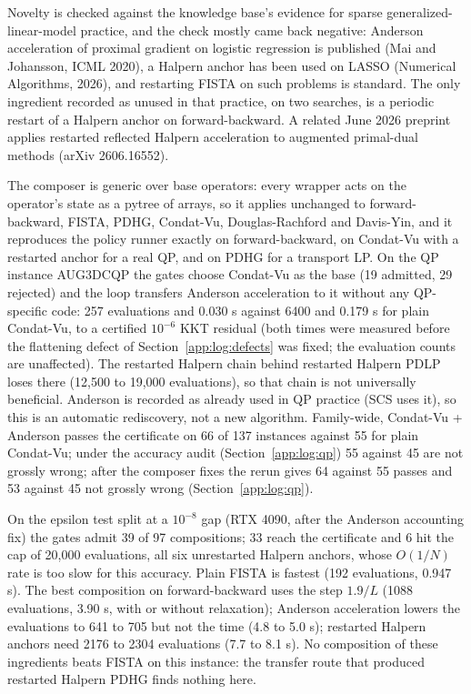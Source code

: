 Novelty is checked against the knowledge base's evidence for sparse
generalized-linear-model practice, and the check mostly came back negative:
Anderson acceleration of proximal gradient on logistic regression is
published (Mai and Johansson, ICML 2020), a Halpern anchor has been used on
LASSO (Numerical Algorithms, 2026), and restarting FISTA on such problems is
standard. The only ingredient recorded as unused in that practice, on two
searches, is a periodic restart of a Halpern anchor on forward-backward. A
related June 2026 preprint applies restarted reflected Halpern acceleration
to augmented primal-dual methods (arXiv 2606.16552).

The composer is generic over base operators: every wrapper acts on the
operator's state as a pytree of arrays, so it applies unchanged to forward-backward, FISTA,
PDHG, Condat-Vu, Douglas-Rachford and Davis-Yin, and it reproduces the policy
runner exactly on forward-backward, on Condat-Vu with a restarted anchor for a
real QP, and on PDHG for a transport LP. On the QP instance AUG3DCQP the gates
choose Condat-Vu as the base (19 admitted, 29 rejected) and the loop transfers
Anderson acceleration to it without any QP-specific code: 257 evaluations and
0.030 s against 6400 and 0.179 s for plain Condat-Vu, to a certified $10^{-6}$
KKT residual (both times were measured before the flattening defect of
Section~\ref{app:log:defects} was fixed; the evaluation counts are unaffected). The restarted Halpern chain behind restarted Halpern PDLP loses
there (12,500 to 19,000 evaluations), so that chain is not universally
beneficial. Anderson is recorded as already used in QP practice (SCS uses it),
so this is an automatic rediscovery, not a new algorithm. Family-wide, Condat-Vu + Anderson passes the
certificate on 66 of 137 instances against 55 for plain Condat-Vu; under the
accuracy audit (Section~\ref{app:log:qp}) 55 against 45 are not grossly
wrong; after the composer fixes the rerun gives 64 against 55 passes and 53
against 45 not grossly wrong (Section~\ref{app:log:qp}).

On the epsilon test split at a $10^{-8}$ gap (RTX 4090, after the Anderson accounting fix)
the gates admit 39 of 97 compositions; 33 reach the certificate and 6 hit the cap of
20,000 evaluations, all six unrestarted Halpern anchors, whose $O(1/N)$ rate is too slow
for this accuracy. Plain FISTA is fastest (192 evaluations, 0.947 s). The best
composition on forward-backward uses the step $1.9/L$ (1088 evaluations, 3.90 s, with or
without relaxation); Anderson acceleration lowers the evaluations to 641 to 705 but not
the time (4.8 to 5.0 s); restarted Halpern anchors need 2176 to 2304 evaluations (7.7 to
8.1 s). No composition of these ingredients beats FISTA on this instance: the transfer
route that produced restarted Halpern PDHG finds nothing here.

